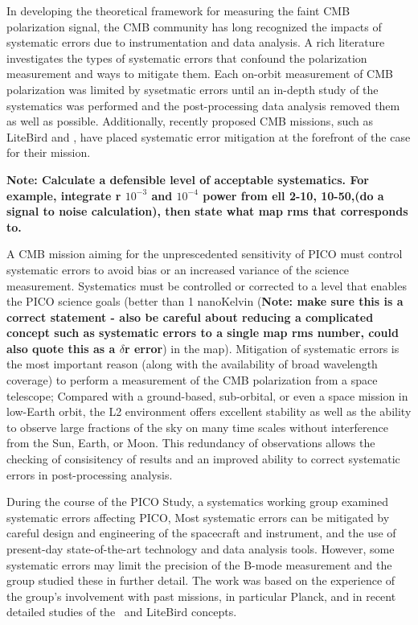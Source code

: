 \documentclass[PICOReport.tex]{subfiles}
\begin{document}
In developing the theoretical framework for measuring the faint CMB
polarization signal, the CMB community has long recognized the impacts
of systematic errors due to instrumentation and data analysis.   A rich literature investigates the types of
systematic errors that confound the polarization measurement and ways
to mitigate them\cite{hu03}. 
Each on-orbit measurement of CMB polarization was limited by
sysetmatic errors until an in-depth study of the systematics was
performed and the post-processing data analysis removed them as well
as possible\cite{Bennett13,planck2016_xlvi}. 
Additionally, recently proposed CMB missions, such as LiteBird and \core, have placed
systematic error mitigation at the forefront of the case for their
mission\cite{hazumi2012,wallis2017,Natoli2018}.

\textbf{Note: Calculate a defensible level of acceptable systematics.
For example, integrate r $10^{-3}$ and $10^{-4}$ power from ell 2-10, 10-50,(do a signal to
noise calculation), then state what map rms that corresponds to.  }

A CMB mission aiming for the unprescedented sensitivity of PICO must control
systematic errors to avoid bias or an increased variance of the
science measurement.   
Systematics must be controlled or corrected to a level that enables the PICO
science goals (better than 1 nanoKelvin (\textbf{Note: make sure this is a
  correct statement - also be careful about reducing a complicated
  concept such as systematic errors to a single map rms number, could also
  quote this as a $\delta$r error}) in the map).
Mitigation of systematic errors is the most important reason (along
with the availability of broad wavelength coverage) to perform a
measurement of the CMB polarization from a space telescope; Compared
with a ground-based, sub-orbital, or even a space mission in 
low-Earth orbit, the L2 environment offers excellent stability as well
as the ability to observe large fractions of the sky on many time
scales without interference from the Sun, Earth, or Moon.
This redundancy of observations allows the checking of consisitency of
results and an improved ability to correct systematic errors in
post-processing analysis.

During the course of the PICO Study, a systematics working group
examined systematic errors affecting PICO,
Most  systematic errors can be mitigated by careful design and engineering of 
the spacecraft and instrument, and the use of present-day state-of-the-art
technology and data analysis tools.   
However, some systematic errors may
limit the precision of the B-mode measurement and the group studied
these in further detail. 
The work was based on the experience of the group's involvement with
past missions, in particular Planck, and in recent detailed studies of 
the \core\ and LiteBird  concepts.
\end{document}
